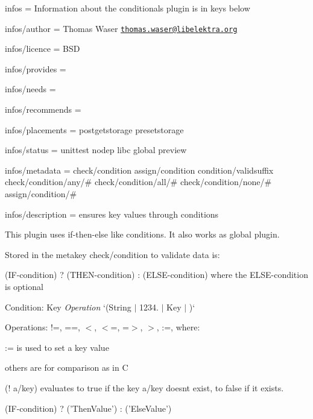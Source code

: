 
\begin{DoxyItemize}
\item infos = Information about the conditionals plugin is in keys below
\item infos/author = Thomas Waser \href{mailto:thomas.waser@libelektra.org}{\tt thomas.\+waser@libelektra.\+org}
\item infos/licence = B\+SD
\item infos/provides =
\item infos/needs =
\item infos/recommends =
\item infos/placements = postgetstorage presetstorage
\item infos/status = unittest nodep libc global preview
\item infos/metadata = check/condition assign/condition condition/validsuffix check/condition/any/\# check/condition/all/\# check/condition/none/\# assign/condition/\#
\item infos/description = ensures key values through conditions
\end{DoxyItemize}

This plugin uses if-\/then-\/else like conditions. It also works as global plugin.

Stored in the metakey {\ttfamily check/condition} to validate data is\+:

{\ttfamily (I\+F-\/condition) ? (T\+H\+E\+N-\/condition) \+: (E\+L\+S\+E-\/condition)} where the E\+L\+S\+E-\/condition is optional

Condition\+: {\ttfamily Key} {\itshape Operation} `(\textquotesingle{}String\textquotesingle{} $\vert$ \textquotesingle{}1234.\textquotesingle{} $\vert$ Key $\vert$ \textquotesingle{}\textquotesingle{})`

Operations\+: {\ttfamily !=, ==, $<$, $<$=, =$>$, $>$, \+:=}, where\+:


\begin{DoxyItemize}
\item {\ttfamily \+:=} is used to set a key value
\item others are for comparison as in C
\end{DoxyItemize}

{\ttfamily (! a/key)} evaluates to true if the key {\ttfamily a/key} doesn\textquotesingle{}t exist, to false if it exists.


\begin{DoxyCode}
(IF-condition) ? ('ThenValue') : ('ElseValue')
\end{DoxyCode}


